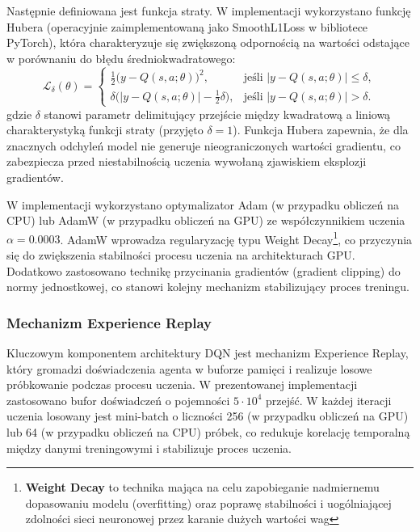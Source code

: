 \documentclass[a4paper,12pt]{article}
\begin{document}
Następnie definiowana jest funkcja straty. W implementacji wykorzystano funkcję Hubera (operacyjnie zaimplementowaną jako SmoothL1Loss w bibliotece PyTorch), która charakteryzuje się zwiększoną odpornością na wartości odstające w porównaniu do błędu średniokwadratowego:
\begin{equation}
\mathcal{L}_\delta(\theta) =
\begin{cases}
\tfrac12\bigl(y - Q(s,a;\theta)\bigr)^2, & \text{jeśli } |y - Q(s,a;\theta)| \le \delta,\\
\delta\bigl(|y - Q(s,a;\theta)| - \tfrac12\delta\bigr), & \text{jeśli } |y - Q(s,a;\theta)| > \delta.
\end{cases}
\end{equation}
gdzie \(\delta\) stanowi parametr delimitujący przejście między kwadratową a liniową charakterystyką funkcji straty (przyjęto \(\delta=1\)). Funkcja Hubera zapewnia, że dla znacznych odchyleń model nie generuje nieograniczonych wartości gradientu, co zabezpiecza przed niestabilnością uczenia wywołaną zjawiskiem eksplozji gradientów. 

W implementacji wykorzystano optymalizator Adam (w przypadku obliczeń na CPU) lub AdamW (w przypadku obliczeń na GPU) ze współczynnikiem uczenia \(\alpha=0.0003\). AdamW wprowadza regularyzację typu Weight Decay\footnote{\textbf{Weight Decay} to technika mająca na celu zapobieganie nadmiernemu dopasowaniu modelu (overfitting) oraz poprawę stabilności i uogólniającej zdolności sieci neuronowej przez karanie dużych wartości wag}, co przyczynia się do zwiększenia stabilności procesu uczenia na architekturach GPU. Dodatkowo zastosowano technikę przycinania gradientów (gradient clipping) do normy jednostkowej, co stanowi kolejny mechanizm stabilizujący proces treningu.

\subsubsection{Mechanizm Experience Replay}

Kluczowym komponentem architektury DQN jest mechanizm Experience Replay, który gromadzi doświadczenia agenta w buforze pamięci i realizuje losowe próbkowanie podczas procesu uczenia. W prezentowanej implementacji zastosowano bufor doświadczeń o pojemności \(5 \cdot 10^4\) przejść. W każdej iteracji uczenia losowany jest mini-batch o liczności 256 (w przypadku obliczeń na GPU) lub 64 (w przypadku obliczeń na CPU) próbek, co redukuje korelację temporalną między danymi treningowymi i stabilizuje proces uczenia. 
\end{document}
